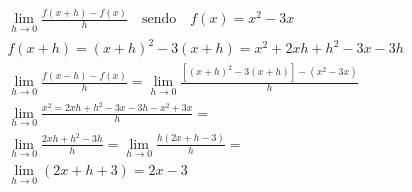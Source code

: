 \begin{ex}
\begin{align}
&\lim_{h\rightarrow 0} \frac{f(x+h)-f(x)}{h}\quad\text{sendo}\quad f(x)=x^2-3x\nonumber\\
&f(x+h)=(x+h)^2-3(x+h)=x^2+2xh+h^2-3x-3h\nonumber\\
&\lim_{h\rightarrow 0} \frac{f(x-h)-f(x)}{h}=\lim_{h\rightarrow 0} \frac{[(x+h)^2-3(x+h)]-(x^2-3x)}{h}\nonumber\\
&\lim_{h\rightarrow 0} \frac{x^2=2xh+h^2-3x-3h-x^2+3x}{h}=\nonumber\\
&\lim_{h\rightarrow 0} \frac{2xh+h^2-3h}{h}=\lim_{h\rightarrow 0} \frac{h(2x+h-3)}{h}=\nonumber\\
&\lim_{h\rightarrow 0} (2x+h+3)=2x-3\nonumber
\end{align}
\end{ex}
